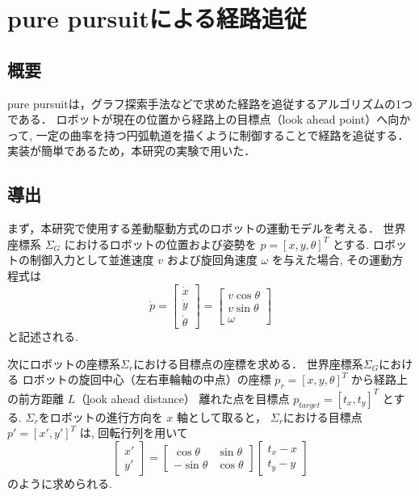 \chapter{pure pursuitによる経路追従}

\section{概要}
pure pursuitは，グラフ探索手法などで求めた経路を追従するアルゴリズムの1つである．
ロボットが現在の位置から経路上の目標点（look ahead point）へ向かって, 
一定の曲率を持つ円弧軌道を描くように制御することで経路を追従する．
実装が簡単であるため，本研究の実験で用いた．

\section{導出}
まず，本研究で使用する差動駆動方式のロボットの運動モデルを考える．
世界座標系 $\Sigma_G$ におけるロボットの位置および姿勢を $p = [x, y, \theta]^T$ とする. 
ロボットの制御入力として並進速度 $v$ および旋回角速度 $\omega$ を与えた場合, 
その運動方程式は
\begin{equation}
\dot{p}
=
\begin{bmatrix}
\dot{x} \\
\dot{y} \\
\dot{\theta}
\end{bmatrix}
=
\begin{bmatrix}
v \cos \theta \\
v \sin \theta \\
\omega
\end{bmatrix}
\label{eq:diff_kinematics}
\end{equation}
と記述される. 

次にロボットの座標系$\Sigma_r$における目標点の座標を求める．
世界座標系$\Sigma_G$における
ロボットの旋回中心（左右車輪軸の中点）の座標 $p_r = [x, y, \theta]^T$ 
から経路上の前方距離 $L$（\underline{l}ook ahead distance）
離れた点を目標点 $p_{target} = [t_x, t_y]^T$ とする. 
$\Sigma_r$をロボットの進行方向を $x$ 軸として取ると，
$\Sigma_r$における目標点 $p' = [x', y']^T$ は, 回転行列を用いて
\begin{equation}
  \begin{bmatrix}
    x' \\
    y'
  \end{bmatrix}
  =
  \begin{bmatrix}
    \cos \theta & \sin \theta \\
    -\sin \theta & \cos \theta
  \end{bmatrix}
  \begin{bmatrix}
    t_x - x \\
    t_y - y
  \end{bmatrix}
  \label{eq:coord_trans}
\end{equation}
のように求められる. 

